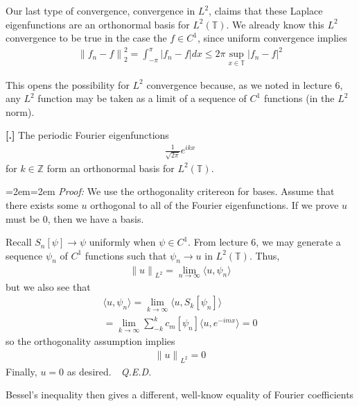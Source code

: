 \documentclass{article}
\newcommand{\Z}{{\mathbb{Z}}}
\newcommand{\bT}{\mathbb{T}}
\newcommand{\norm}[1]{{ \lVert {#1} \rVert}}
\newcounter{result}[section]
\newenvironment{res}[1][]{\refstepcounter{result}\par\medskip
	\noindent \textbf{[\thesection.\theresult] #1} \rmfamily}{\medskip}
\newenvironment{pf}{%
	\par%
	\medskip
	\leftskip=2em\rightskip=2em%
	\noindent\ignorespaces \textit{Proof:} \newline}{%
	\,\, \newline \textit{Q.E.D.}\par\medskip}
\begin{document}
	Our last type of convergence, convergence in $L^{2}$, claims that these Laplace eigenfunctions are an orthonormal basis for $L^{2}(\bT)$. We already know this $L^{2}$ convergence to be true in the case the $f \in C^{1}$, since uniform convergence implies 
	\begin{align*}
		\norm{f_{n} - f}_{2}^{2} = \int_{-\pi}^{\pi} |f_{n} - f|dx \leq 2\pi \sup_{x \in \bT} |f_{n}-f|^{2}
	\end{align*}
	
	This opens the possibility for $L^{2}$ convergence because, as we noted in lecture 6, any $L^{2}$ function may be taken as a limit of a sequence of $C^{1}$ functions (in the $L^{2}$ norm). 
	
	\begin{res}
		The periodic Fourier eigenfunctions
		\begin{align*}
			\frac{1}{\sqrt{2 \pi}} e^{ikx} 
		\end{align*}
		for $k \in \Z$ form an orthonormal basis for $L^{2}(\bT)$. 
	\end{res}
	\begin{pf}
		We use the orthogonality critereon for bases. Assume that there exists some $u$ orthogonal to all of the Fourier eigenfunctions. If we prove $u$ must be $0$, then we have a basis. 
		
		Recall $S_{n}[\psi] \to \psi$ uniformly when $\psi \in C^{1}$. From lecture $6$, we may generate a sequence $\psi_{n}$ of $C^{1}$ functions such that $\psi_{n} \to u$ in $L^{2}(\bT)$. Thus, 
		\begin{align*}
			\norm{u}_{L^{2}} = \lim_{n \to \infty} \langle u,\psi_{n} \rangle 
		\end{align*}
		but we also see that 
		\begin{align*}
			\langle u,\psi_{n} \rangle = \lim_{k \to \infty} \langle u, S_{k}[\psi_n] \rangle  \\
			= \lim_{k \to \infty} \sum_{-k}^{k} c_{m}[\psi_n] \langle u, e^{-imx} \rangle =0
		\end{align*}
		so the orthogonality assumption implies 
		\begin{align*}
			\norm{u}_{L^{2}} = 0
		\end{align*}
		Finally, $u=0$ as desired. 
	\end{pf}
	
	
	Bessel's inequality then gives a different, well-know equality of Fourier coefficients
	
\end{document}
